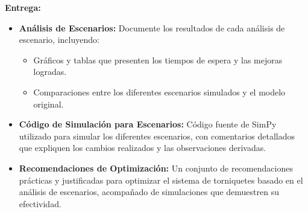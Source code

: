 \documentclass[12pt]{article}
\begin{document}
\textbf{Entrega:}
\begin{itemize}
    \item \textbf{Análisis de Escenarios:} Documente los resultados de cada análisis de escenario, incluyendo:
    \begin{itemize}
        \item Gráficos y tablas que presenten los tiempos de espera y las mejoras logradas.
        \item Comparaciones entre los diferentes escenarios simulados y el modelo original.
    \end{itemize}
    \item \textbf{Código de Simulación para Escenarios:} Código fuente de SimPy utilizado para simular los diferentes escenarios, con comentarios detallados que expliquen los cambios realizados y las observaciones derivadas.
    \item \textbf{Recomendaciones de Optimización:} Un conjunto de recomendaciones prácticas y justificadas para optimizar el sistema de torniquetes basado en el análisis de escenarios, acompañado de simulaciones que demuestren su efectividad.
\end{itemize}
\end{document}
